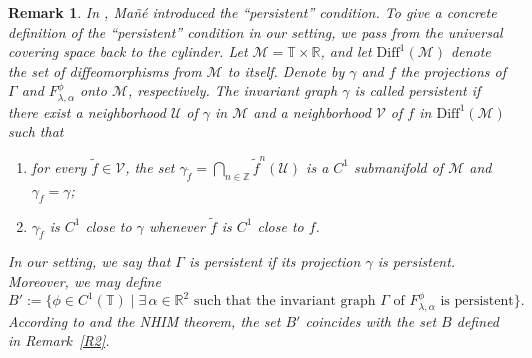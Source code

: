 \documentclass{amsart}
\newtheorem{Remark}[Theorem]{Remark}
\begin{document}
	
	\begin{Remark}
		In \cite[Page 1]{Man78}, Ma\~{n}\'{e} introduced the ``persistent'' condition. To give a concrete definition of the ``persistent'' condition in our setting, we pass from the universal covering space back to the cylinder. Let \(\mathcal M = \mathbb{T} \times \mathbb{R}\), and let \(\mathrm{Diff}^1(\mathcal M)\) denote the set of diffeomorphisms from \(\mathcal M\) to itself. Denote by \(\gamma\) and \(f\) the projections of \(\Gamma\) and \(F_{\lambda,\alpha}^\phi\) onto \(\mathcal M\), respectively. The invariant graph \(\gamma\) is called {persistent} if there exist a neighborhood \(\mathcal{U}\) of \(\gamma\) in \(\mathcal M\) and a neighborhood \(\mathcal{V}\) of \(f\) in \(\mathrm{Diff}^1(\mathcal M)\) such that
		\begin{enumerate}
			\item[(a)] for every \(\tilde{f} \in \mathcal{V}\), the set \(\gamma_{\tilde{f}} = \bigcap_{n \in \mathbb{Z}} \tilde{f}^n(\mathcal{U})\) is a \(C^1\) submanifold of \(\mathcal M\) and \(\gamma_f = \gamma\);
			\item[(b)] \(\gamma_{\tilde{f}}\) is \(C^1\) close to \(\gamma\) whenever \(\tilde{f}\) is \(C^1\) close to \(f\).
		\end{enumerate}
		In our setting, we say that \(\Gamma\) is persistent if its projection \(\gamma\) is persistent. Moreover, we may define
		\[
		B' := \bigl\{ \phi \in C^1(\mathbb{T}) \;\big|\; \exists\, \alpha \in \mathbb{R}^2 \text{ such that the invariant graph } \Gamma \text{ of } F_{\lambda,\alpha}^\phi \text{ is persistent} \bigr\}.
		\]
		According to \cite{Man78} and the NHIM theorem, the set \(B'\) coincides with the set \(B\) defined in Remark~\ref{R2}.
	\end{Remark}
	
	
\end{document}
